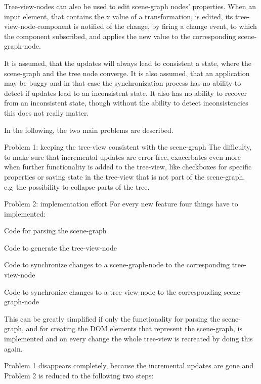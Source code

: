 Tree-view-nodes can also be used to edit scene-graph nodes' properties. When an
input element, that contains the x value of a transformation, is edited, its
tree-view-node-component is notified of the change, by firing a change event, to
which the component subscribed, and applies the new value to the corresponding
scene-graph-node.

It is assumed, that the updates will always lead to consistent a state, where the
scene-graph and the tree node converge. It is also assumed, that an application
may be buggy and in that case the synchronization process has no ability to
detect if updates lead to an inconsistent state. It also has no ability to
recover from an inconsistent state, though without the ability to detect
inconsistencies this does not really matter.

In the following, the two main problems are described.

\begin{description*}
  \item[Problem 1: keeping the tree-view consistent with the scene-graph]
    The difficulty, to make sure that incremental updates are error-free,
    exacerbates even more when further functionality is
    added to the tree-view,  like checkboxes for
    specific properties or saving state in the tree-view that is not part of
    the scene-graph, e.g~the possibility to collapse parts of the tree.
  \item[Problem 2: implementation effort]
    For every new feature four things have to implemented:
    \begin{enumerate*}
      \item Code for parsing the scene-graph
      \item Code to generate the tree-view-node
      \item Code to synchronize changes to a scene-graph-node to the corresponding tree-view-node
      \item Code to synchronize changes to a tree-view-node to the corresponding scene-graph-node
    \end{enumerate*}
\end{description*}

This can be greatly simplified if only the functionality for parsing the
scene-graph, and  for creating the \gls{DOM} elements that represent the scene-graph,
is implemented and on every change the whole tree-view is recreated by doing
this again.

Problem 1 disappears completely, because the incremental updates are gone and
Problem 2 is reduced to the following two steps:

